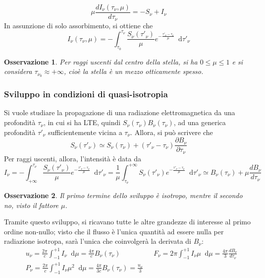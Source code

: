 \documentclass[11pt, a4paper]{scrartcl}
\theoremstyle{style}
\newtheorem{osservazione}{Osservazione}[section]
\theoremstyle{style1}
\newcommand{\dd}{\mathop{}\!\mathrm{d}}
\numberwithin{equation}{subsection}
\begin{document}
\begin{equation}
	\mu \frac{d I_\nu (\tau _\nu ,\mu )}{d\tau _\nu} = - S_\nu + I_\nu
\end{equation}
In assunzione di solo assorbimento, si ottiene che
\begin{equation}
	I_\nu (\tau _\nu , \mu ) = - \int _{\tau _0}^{\tau _\nu } \frac{S_\nu (\tau '_\nu )}{\mu } e^{-\frac{\tau '_\nu  - \tau _\nu }{\mu }}\dd \tau '_\nu 
\end{equation}
\begin{osservazione}
Per raggi uscenti dal centro della stella, si ha $0\le \mu \le 1$ e si considera $\tau _{\nu _0} \approx +\infty$, cio\`e la stella \`e un mezzo otticamente spesso.
\end{osservazione}
\subsubsection{Sviluppo in condizioni di quasi-isotropia}

Si vuole studiare la propagazione di una radiazione elettromagnetica da una profondit\`a $\tau _\nu $, in cui si ha LTE, quindi $S_\nu (\tau _\nu ) B_\nu (\tau _\nu )$, ad una generica profondit\`a $\tau '_\nu $ sufficientemente vicina a $\tau _\nu $.
Allora, si pu\`o scrivere che
\[
S_\nu (\tau '_\nu ) \simeq S_\nu (\tau_ \nu ) + (\tau '_\nu  - \tau _\nu ) \frac{\partial B_\nu }{\partial \tau _\nu } 
\] 
Per raggi uscenti, allora, l'intensit\`a \`e data da 
\begin{equation}
	I_\nu = - \int _{+\infty}^{\tau _\nu } \frac{S_\nu (\tau '_\nu )}{\mu }e^{- \frac{\tau '_\nu - \tau _\nu }{\mu }} \dd \tau '_\nu =\frac{1}{\mu } \int _{\tau _\nu }^{+\infty}S_\nu (\tau '_\nu )e^{- \frac{\tau '_\nu - \tau _\nu }{\mu }} \dd \tau '_\nu \simeq B_\nu (\tau _\nu ) + \mu  \frac{d B_\nu }{d \tau _\nu } 
\end{equation}
\begin{osservazione}
Il primo termine dello sviluppo \`e isotropo, mentre il secondo no, visto il fattore $\mu $.
\end{osservazione}
\noindent Tramite questo sviluppo, si ricavano tutte le altre grandezze di interesse al primo ordine non-nullo; visto che il flusso \`e l'unica quantit\`a ad essere nulla per radiazione isotropa, sar\`a l'unica che coinvolger\`a la derivata di $B_\nu $:
\[
\begin{split}
	&u_\nu  = \frac{2\pi}{c} \int_{-1}^{+1} I_\nu  \dd \mu = \frac{4\pi}{c} B_\nu (\tau _\nu ) \hspace{2cm} F_\nu  = 2 \pi \int _{-1}^{+1} I_\nu  \mu  \dd \mu  = \frac{4\pi}{3} \frac{d B_\nu }{d \tau _\nu } \\
	& P_\nu  = \frac{2\pi}{c} \int _{-1} ^{+1} I_\nu \mu ^2 \dd \mu  = \frac{4\pi }{3c} B_\nu (\tau _\nu ) = \frac{u_\nu }{3}
\end{split}
\] 
\end{document}
